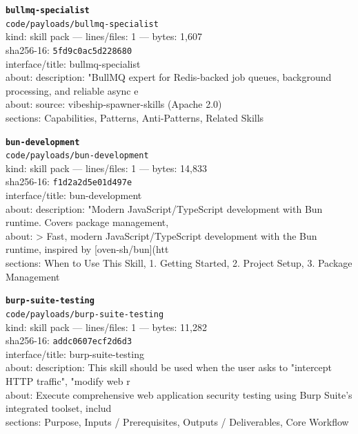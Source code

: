 \noindent\textbf{\texttt{bullmq-specialist}}\\
\texttt{code/payloads/bullmq-specialist}\\
kind: skill pack --- lines/files: 1 --- bytes: 1,607\\
sha256-16: \texttt{5fd9c0ac5d228680}\\
interface/title: bullmq-specialist\\
about: description: "BullMQ expert for Redis-backed job queues, background processing, and reliable async e\\
about: source: vibeship-spawner-skills (Apache 2.0)\\
sections: Capabilities, Patterns, Anti-Patterns, Related Skills\\
\vspace*{6.0pt}

\noindent\textbf{\texttt{bun-development}}\\
\texttt{code/payloads/bun-development}\\
kind: skill pack --- lines/files: 1 --- bytes: 14,833\\
sha256-16: \texttt{f1d2a2d5e01d497e}\\
interface/title: bun-development\\
about: description: "Modern JavaScript/TypeScript development with Bun runtime. Covers package management, \\
about: > Fast, modern JavaScript/TypeScript development with the Bun runtime, inspired by [oven-sh/bun](htt\\
sections: When to Use This Skill, 1. Getting Started, 2. Project Setup, 3. Package Management\\
\vspace*{6.0pt}
\newpage

\noindent\textbf{\texttt{burp-suite-testing}}\\
\texttt{code/payloads/burp-suite-testing}\\
kind: skill pack --- lines/files: 1 --- bytes: 11,282\\
sha256-16: \texttt{addc0607ecf2d6d3}\\
interface/title: burp-suite-testing\\
about: description: This skill should be used when the user asks to "intercept HTTP traffic", "modify web r\\
about: Execute comprehensive web application security testing using Burp Suite's integrated toolset, includ\\
sections: Purpose, Inputs / Prerequisites, Outputs / Deliverables, Core Workflow\\
\vspace*{6.0pt}

